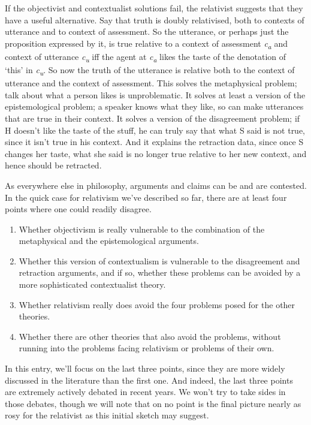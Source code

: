 \documentclass[
  11pt,
  letterpaper,
  DIV=11,
  numbers=noendperiod,
  twoside]{scrartcl}
\providecommand{\tightlist}{%
  \setlength{\itemsep}{0pt}\setlength{\parskip}{0pt}}
\begin{document}
If the objectivist and contextualist solutions fail, the relativist
suggests that they have a useful alternative. Say that truth is doubly
relativised, both to contexts of utterance and to context of assessment.
So the utterance, or perhaps just the proposition expressed by it, is
true relative to a context of assessment \emph{c\textsubscript{a}} and
context of utterance \emph{c\textsubscript{u}} iff the agent at
\emph{c\textsubscript{a}} likes the taste of the denotation of `this' in
\emph{c\textsubscript{u}}. So now the truth of the utterance is relative
both to the context of utterance and the context of assessment. This
solves the metaphysical problem; talk about what a person likes is
unproblematic. It solves at least a version of the epistemological
problem; a speaker knows what they like, so can make utterances that are
true in their context. It solves a version of the disagreement problem;
if H doesn't like the taste of the stuff, he can truly say that what S
said is not true, since it isn't true in his context. And it explains
the retraction data, since once S changes her taste, what she said is no
longer true relative to her new context, and hence should be retracted.

As everywhere else in philosophy, arguments and claims can be and are
contested. In the quick case for relativism we've described so far,
there are at least four points where one could readily disagree.

\begin{enumerate}
\def\labelenumi{\arabic{enumi}.}
\tightlist
\item
  Whether objectivism is really vulnerable to the combination of the
  metaphysical and the epistemological arguments.
\item
  Whether this version of contextualism is vulnerable to the
  disagreement and retraction arguments, and if so, whether these
  problems can be avoided by a more sophisticated contextualist theory.
\item
  Whether relativism really does avoid the four problems posed for the
  other theories.
\item
  Whether there are other theories that also avoid the problems, without
  running into the problems facing relativism or problems of their own.
\end{enumerate}

In this entry, we'll focus on the last three points, since they are more
widely discussed in the literature than the first one. And indeed, the
last three points are extremely actively debated in recent years. We
won't try to take sides in those debates, though we will note that on no
point is the final picture nearly as rosy for the relativist as this
initial sketch may suggest.
\end{document}
